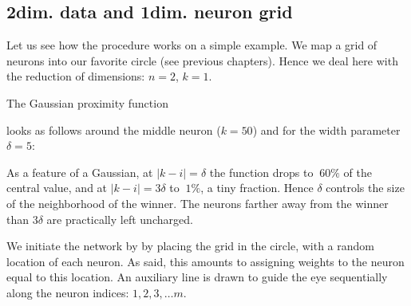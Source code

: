 \documentclass[letterpaper,10pt,english]{jupyterBook}
\begin{document}
\subsection{2\sphinxhyphen{}dim. data and 1\sphinxhyphen{}dim. neuron grid}
\label{\detokenize{docs/som:dim-data-and-1-dim-neuron-grid}}
\sphinxAtStartPar
Let us see how the procedure works on a simple example. We map a grid of  neurons into our favorite circle (see previous chapters). Hence we deal here with the reduction of dimensions: \(n=2\), \(k=1\).

\begin{sphinxVerbatim}[commandchars=\\\{\}]
 
\end{sphinxVerbatim}

\sphinxAtStartPar
The Gaussian proximity function

\begin{sphinxVerbatim}[commandchars=\\\{\}]
                        
      
\end{sphinxVerbatim}

\sphinxAtStartPar
looks as follows around the middle neuron (\(k=50\)) and for the width parameter \(\delta=5\):

\noindent{}

\sphinxAtStartPar
As a feature of a Gaussian, at \(|k-i|=\delta\) the function drops to \(~60\%\) of the central value, and at \(|k-i|=3\delta\) to \(~1\%\), a tiny fraction. Hence \(\delta\) controls the size of the neighborhood of the winner. The neurons farther away from the winner than \(3\delta\) are practically left uncharged.

\sphinxAtStartPar
We initiate the network by by placing the grid in the circle, with a random location of each neuron. As said, this amounts to assigning weights to the neuron equal to this location. An auxiliary line is drawn to guide the eye sequentially along the neuron indices: \(1,2,3,\dots m\).
\end{document}
